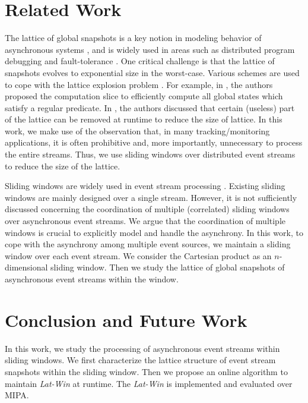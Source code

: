 \documentclass[12pt,journal,letterpaper,compsoc]{IEEEtran}
\begin{document}
\section{Related Work}
\label{sec:related-work}

The lattice of global snapshots is a key notion in modeling behavior of asynchronous systems \cite{Schwarz94, Babaoglu96, Babaoglu95, Cooper91, Hua10, Huang09, Huang10a, Huang11, Mittal07, Sen07}, and is widely used in areas such as distributed program debugging \cite{Garg94, Garg96} and fault-tolerance \cite{Mittal05}. One critical challenge is that the lattice of snapshots evolves to exponential size in the worst-case. Various schemes are used to cope with the lattice explosion problem \cite{Mittal07, Sen07, Dumais02, Jard94, Chen11}. For example, in \cite{Mittal07, Sen07}, the authors proposed the computation slice to efficiently compute all global states which satisfy a regular predicate\cite{Mittal07}. In \cite{Jard94}, the authors discussed that certain (useless) part of the lattice can be removed at runtime to reduce the size of lattice. In this work, we make use of the observation that, in many tracking/monitoring applications, it is often prohibitive and, more importantly, unnecessary to process the entire streams. Thus, we use sliding windows over distributed event streams to reduce the size of the lattice.

Sliding windows are widely used in event stream processing \cite{Babcock02, Braverman11, Datar02, Tirthapura06}. Existing sliding windows are mainly designed over a single stream. However, it is not sufficiently discussed concerning the coordination of multiple (correlated) sliding windows over asynchronous event streams. We argue that the coordination of multiple windows is crucial to explicitly model and handle the asynchrony. In this work, to cope with the asynchrony among multiple event sources, we maintain a sliding window over each event stream. We consider the Cartesian product as an $n$-dimensional sliding window. Then we study the lattice of global snapshots of asynchronous event streams within the window.

\section{Conclusion and Future Work}
\label{sec:conclusion}

In this work, we study the processing of asynchronous event streams within sliding windows. We first characterize the lattice structure of event stream snapshots within the sliding window. Then we propose an online algorithm to maintain {\it Lat-Win} at runtime. The {\it Lat-Win} is implemented and evaluated over MIPA.
\end{document}
